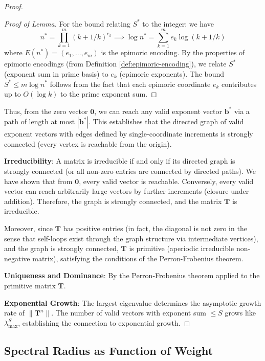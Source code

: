 \begin{proof}
\begin{proof}[Proof of Lemma]
For the bound relating $S^*$ to the integer: we have
\begin{equation}
n^* = \prod_{k=1}^m (k+1/k)^{e_k} \implies \log n^* = \sum_{k=1}^m e_k \log(k+1/k)
\end{equation}
where $E(n^*) = (e_1, \ldots, e_m)$ is the epimoric encoding. By the properties of epimoric encodings (from Definition \ref{def:epimoric-encoding}), we relate $S^*$ (exponent sum in prime basis) to $e_k$ (epimoric exponents). The bound $S^* \leq m \log n^*$ follows from the fact that each epimoric coordinate $e_k$ contributes up to $O(\log k)$ to the prime exponent sum.

\end{proof}

Thus, from the zero vector $\mathbf{0}$, we can reach any valid exponent vector $\mathbf{b}^*$ via a path of length at most $|\mathbf{b}^*|$. This establishes that the directed graph of valid exponent vectors with edges defined by single-coordinate increments is strongly connected (every vertex is reachable from the origin).

\noindent \textbf{Irreducibility}: A matrix is irreducible if and only if its directed graph is strongly connected (or all non-zero entries are connected by directed paths). We have shown that from $\mathbf{0}$, every valid vector is reachable. Conversely, every valid vector can reach arbitrarily large vectors by further increments (closure under addition). Therefore, the graph is strongly connected, and the matrix $\mathbf{T}$ is irreducible.

Moreover, since $\mathbf{T}$ has positive entries (in fact, the diagonal is not zero in the sense that self-loops exist through the graph structure via intermediate vertices), and the graph is strongly connected, $\mathbf{T}$ is primitive (aperiodic irreducible non-negative matrix), satisfying the conditions of the Perron-Frobenius theorem.

\noindent \textbf{Uniqueness and Dominance}: By the Perron-Frobenius theorem applied to the primitive matrix $\mathbf{T}$.

\noindent \textbf{Exponential Growth}: The largest eigenvalue determines the asymptotic growth rate of $\|\mathbf{T}^n\|$. The number of valid vectors with exponent sum $\leq S$ grows like $\lambda_{\max}^S$, establishing the connection to exponential growth.

\end{proof}

\subsection{Spectral Radius as Function of Weight}
\label{subsec:weighted-spectral}

